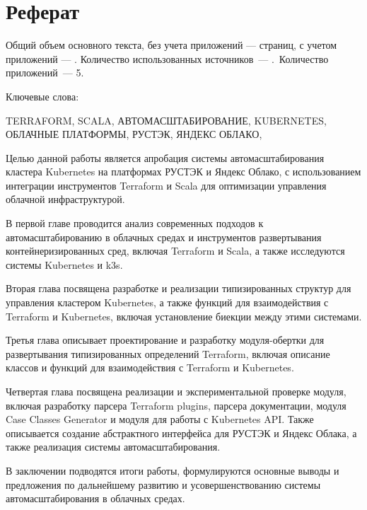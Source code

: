 \chapter*{Реферат}
\thispagestyle{plain}

Общий объем основного текста, без учета приложений ---
\pageref{end_of_main_text} страниц, с учетом приложений ---
\pageref{end_of_document}. Количество использованных источников~--- \thetotalcitations.\ 
Количество приложений~--- 5.

Ключевые слова:

\noindent \uppercase{
terraform,
scala,
автомасштабирование,
kubernetes,
облачные платформы,
РУСТЭК,
Яндекс Облако,
}

Целью данной работы является апробация системы автомасштабирования кластера
Kubernetes на платформах РУСТЭК и Яндекс Облако, с использованием интеграции
инструментов Terraform и Scala для оптимизации управления облачной
инфраструктурой.

В первой главе проводится анализ современных подходов к автомасштабированию в
облачных средах и инструментов развертывания контейнеризированных сред, включая
Terraform и Scala, а также исследуются системы Kubernetes и k3s.

Вторая глава посвящена разработке и реализации типизированных структур для
управления кластером Kubernetes, а также функций для взаимодействия с Terraform
и Kubernetes, включая установление биекции между этими системами.

Третья глава описывает проектирование и разработку модуля-обертки для
развертывания типизированных определений Terraform, включая описание классов и
функций для взаимодействия с Terraform и Kubernetes.

Четвертая глава посвящена реализации и экспериментальной проверке модуля,
включая разработку парсера Terraform plugins, парсера документации, модуля Case
Classes Generator и модуля для работы с Kubernetes API. Также описывается
создание абстрактного интерфейса для РУСТЭК и Яндекс Облака, а также реализация
системы автомасштабирования.

В заключении подводятся итоги работы, формулируются основные выводы и
предложения по дальнейшему развитию и усовершенствованию системы
автомасштабирования в облачных средах.


